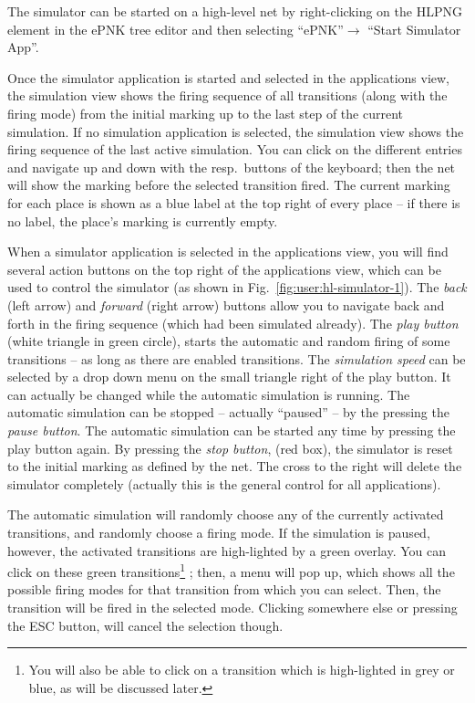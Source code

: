 The simulator can be started on a high-level net by right-clicking on the
HLPNG element in the ePNK tree editor and then selecting 
``ePNK''$\rightarrow$ ``Start Simulator App''.

Once the simulator application is started and selected in the applications view,
the simulation view shows the firing sequence of all transitions (along with the firing mode)
from the initial marking up to the last step of the current simulation.
If no simulation application is selected, the simulation view shows the
firing sequence of the last active simulation.  You can click on the different
entries and navigate up and down with the resp.\ buttons of the keyboard; then
the net will show the marking before the selected transition fired. The
current marking for each place is shown as a blue label at the
top right of every place -- if there is no label, the place's marking is
currently empty.

When a simulator application is selected in the applications view, you will
find several action buttons on the top right of the applications view, which
can be used to control the simulator (as shown in
Fig.~\ref{fig:user:hl-simulator-1}). The \emph{back}%
(left arrow) and \emph{forward}%
(right arrow) buttons allow you to
navigate back and forth in the firing sequence (which had been simulated
already). The \emph{play button} (white triangle in green circle), starts the
automatic and random firing of some transitions -- as long as there are
enabled transitions. The \emph{simulation speed}%
can be selected by a drop
down menu on the small triangle right of the play button. It can actually
be changed while the automatic simulation is running. The automatic
simulation can be stopped -- actually ``paused'' -- by the pressing the
\emph{pause button}.%
The automatic simulation can be started any time by pressing the play button
again. By pressing the \emph{stop button},%
(red box), the simulator is reset to the initial marking as defined by
the net. The cross to the right will delete the simulator completely
(actually this is the general control for all applications).

The automatic simulation will randomly choose any of the currently activated
transitions, and randomly choose a firing mode. If the simulation is paused,
however, the activated transitions are high-lighted by a green overlay. You
can click on these green transitions\footnote
  {You will also be able to click on a transition which is high-lighted in grey
  or blue, as will be discussed later.}%
; then, a menu will pop up, which shows all the possible firing modes for
that transition from which you can select. Then, the transition will be
fired in the selected mode. Clicking somewhere else or pressing the ESC
button, will cancel the selection though.

